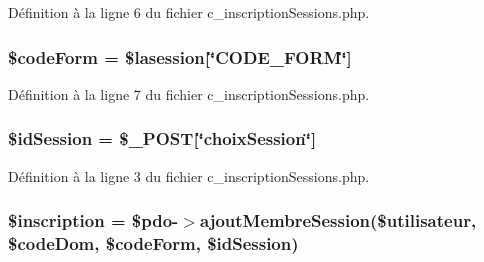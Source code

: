 Définition à la ligne 6 du fichier c\+\_\+inscription\+Sessions.\+php.

\subsubsection[{\texorpdfstring{\$code\+Form}{$codeForm}}]{\setlength{\rightskip}{0pt plus 5cm}\$code\+Form = \$lasession\mbox{[}\char`\"{}C\+O\+D\+E\+\_\+\+F\+O\+RM\char`\"{}\mbox{]}}\hypertarget{c__inscription_sessions_8php_a21a7519d367570012a45d1d104d03556}{}\label{c__inscription_sessions_8php_a21a7519d367570012a45d1d104d03556}


Définition à la ligne 7 du fichier c\+\_\+inscription\+Sessions.\+php.

\subsubsection[{\texorpdfstring{\$id\+Session}{$idSession}}]{\setlength{\rightskip}{0pt plus 5cm}\$id\+Session = \$\+\_\+\+P\+O\+ST\mbox{[}\char`\"{}choix\+Session\char`\"{}\mbox{]}}\hypertarget{c__inscription_sessions_8php_a6ef1232ae13c14eb925618d8c0e4b4ab}{}\label{c__inscription_sessions_8php_a6ef1232ae13c14eb925618d8c0e4b4ab}


Définition à la ligne 3 du fichier c\+\_\+inscription\+Sessions.\+php.

\subsubsection[{\texorpdfstring{\$inscription}{$inscription}}]{\setlength{\rightskip}{0pt plus 5cm}\$inscription = \$pdo-\/$>$ajout\+Membre\+Session(\$utilisateur, \$code\+Dom, \$code\+Form, \$id\+Session)}\hypertarget{c__inscription_sessions_8php_a273e381bb67c864cacd25da3581acb82}{}\label{c__inscription_sessions_8php_a273e381bb67c864cacd25da3581acb82}


